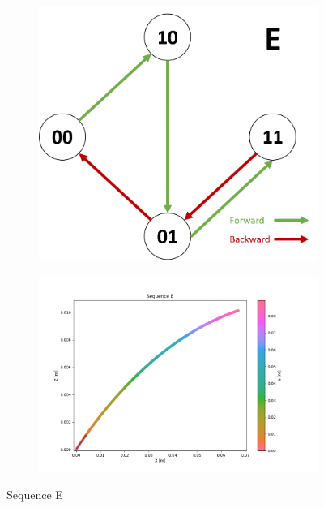         \begin{figure}[h]
            \begin{subfigure}{.3\textwidth}
            \includegraphics[width=\textwidth]{images/S_E.png}
            \end{subfigure}%
            \begin{subfigure}{.7\textwidth}
            \includegraphics[width=\textwidth]{images/E.png}
            \end{subfigure}
            \caption{Sequence E}
        \end{figure}
